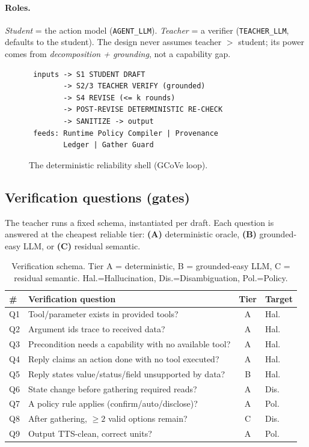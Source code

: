 \documentclass{article}
\begin{document}
\paragraph{Roles.} \emph{Student} = the action model (\texttt{AGENT\_LLM}).
\emph{Teacher} = a verifier (\texttt{TEACHER\_LLM}, defaults to the student). The design
never assumes teacher $>$ student; its power comes from \emph{decomposition +
grounding}, not a capability gap.

\begin{figure}[t]
\centering
\small
\begin{verbatim}
 inputs -> S1 STUDENT DRAFT
        -> S2/3 TEACHER VERIFY (grounded)
        -> S4 REVISE (<= k rounds)
        -> POST-REVISE DETERMINISTIC RE-CHECK
        -> SANITIZE -> output
 feeds: Runtime Policy Compiler | Provenance
        Ledger | Gather Guard
\end{verbatim}
\caption{The deterministic reliability shell (GCoVe loop).}
\label{fig:loop}
\end{figure}

\subsection{Verification questions (gates)}
The teacher runs a fixed schema, instantiated per draft. Each question is answered at
the cheapest reliable tier: \textbf{(A)} deterministic oracle, \textbf{(B)}
grounded-easy LLM, or \textbf{(C)} residual semantic.

\begin{table}[t]
\centering\small
\begin{tabular}{@{}p{0.5cm}p{4.6cm}cp{0.7cm}@{}}
\toprule
\# & Verification question & Tier & Target\\
\midrule
Q1 & Tool/parameter exists in provided tools? & A & Hal.\\
Q2 & Argument ids trace to received data? & A & Hal.\\
Q3 & Precondition needs a capability with no available tool? & A & Hal.\\
Q4 & Reply claims an action done with no tool executed? & A & Hal.\\
Q5 & Reply states value/status/field unsupported by data? & B & Hal.\\
Q6 & State change before gathering required reads? & A & Dis.\\
Q7 & A policy rule applies (confirm/auto/disclose)? & A & Pol.\\
Q8 & After gathering, $\geq 2$ valid options remain? & C & Dis.\\
Q9 & Output TTS-clean, correct units? & A & Pol.\\
\bottomrule
\end{tabular}
\caption{Verification schema. Tier A = deterministic, B = grounded-easy LLM, C =
residual semantic. Hal.=Hallucination, Dis.=Disambiguation, Pol.=Policy.}
\label{tab:gates}
\end{table}
\end{document}
